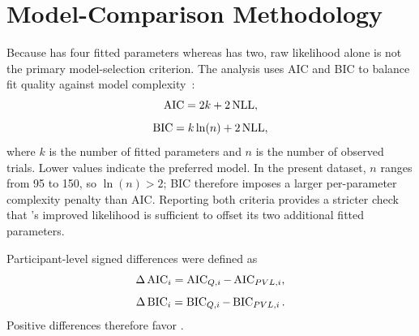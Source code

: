 \section{Model-Comparison Methodology}

Because \PVL{} has four fitted parameters whereas \QL{} has two, raw likelihood alone is not the primary model-selection criterion. The analysis uses AIC and BIC to balance fit quality against model complexity~\cite{akaike1974,schwarz1978}:
\begin{equation}
    \operatorname{AIC}=2k+2\operatorname{NLL},
\end{equation}
\begin{equation}
    \operatorname{BIC}=k\ln(n)+2\operatorname{NLL},
\end{equation}
where \(k\) is the number of fitted parameters and \(n\) is the number of observed trials. Lower values indicate the preferred model. In the present dataset, \(n\) ranges from 95 to 150, so \(\ln(n)>2\); BIC therefore imposes a larger per-parameter complexity penalty than AIC\@. Reporting both criteria provides a stricter check that \PVL{}'s improved likelihood is sufficient to offset its two additional fitted parameters.

Participant-level signed differences were defined as
\begin{equation}
    \Delta\operatorname{AIC}_i=\operatorname{AIC}_{Q,i}-\operatorname{AIC}_{PVL,i},
\end{equation}
\begin{equation}
    \Delta\operatorname{BIC}_i=\operatorname{BIC}_{Q,i}-\operatorname{BIC}_{PVL,i}.
\end{equation}
Positive differences therefore favor \PVL{}.
